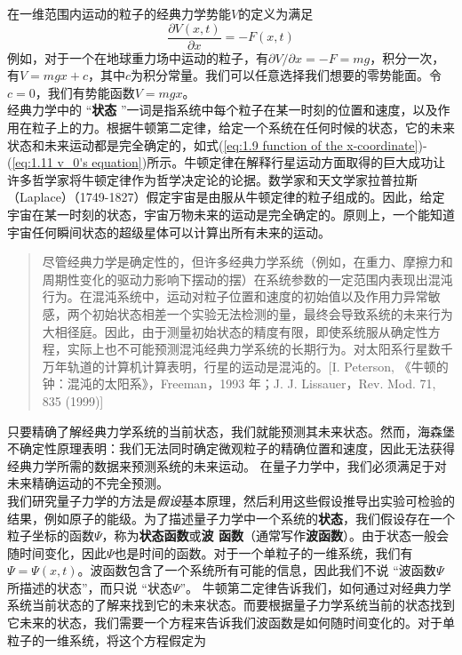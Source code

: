 	 \indent 在一维范围内运动的粒子的经典力学势能$V$的定义为满足
	 \begin{equation}
	 	\boxed{\frac{\partial V \left(x,t\right)}{\partial x} = -F\left(x,t\right)}
	 	\label{eq:1.12 Potential energy in classical mechanics}
	 \end{equation}
	 例如，对于一个在地球重力场中运动的粒子，有$\partial V / \partial x = -F = mg$，积分一次，有$V = mgx+c$，其中$c$为积分常量。我们可以任意选择我们想要的零势能面。令$c=0$，我们有势能函数$V=mgx$。\\
	 \indent 经典力学中的 “\textbf{状态} ”一词是指系统中每个粒子在某一时刻的位置和速度，以及作用在粒子上的力。根据牛顿第二定律，给定一个系统在任何时候的状态，它的未来状态和未来运动都是完全确定的，如式(\ref{eq:1.9 function of the x-coordinate})-(\ref{eq:1.11 v_0's equation})所示。牛顿定律在解释行星运动方面取得的巨大成功让许多哲学家将牛顿定律作为哲学决定论的论据。数学家和天文学家拉普拉斯（Laplace）（1749-1827）假定宇宙是由服从牛顿定律的粒子组成的。因此，给定宇宙在某一时刻的状态，宇宙万物未来的运动是完全确定的。原则上，一个能知道宇宙任何瞬间状态的超级星体可以计算出所有未来的运动。
	\begin{quote}
		\small %
		\noindent %
		尽管经典力学是确定性的，但许多经典力学系统（例如，在重力、摩擦力和周期性变化的驱动力影响下摆动的摆）在系统参数的一定范围内表现出混沌行为。在混沌系统中，运动对粒子位置和速度的初始值以及作用力异常敏感，两个初始状态相差一个实验无法检测的量，最终会导致系统的未来行为大相径庭。因此，由于测量初始状态的精度有限，即使系统服从确定性方程，实际上也不可能预测混沌经典力学系统的长期行为。对太阳系行星数千万年轨道的计算机计算表明，行星的运动是混沌的。[I. Peterson, 《牛顿的钟：混沌的太阳系》，Freeman，1993 年；J. J. Lissauer，Rev. Mod. 71, 835 (1999)]
	\end{quote}
	\indent 
	\indent 只要精确了解经典力学系统的当前状态，我们就能预测其未来状态。然而，海森堡不确定性原理表明：我们无法同时确定微观粒子的精确位置和速度，因此无法获得经典力学所需的数据来预测系统的未来运动。 在量子力学中，我们必须满足于对未来精确运动的不完全预测。\\
	\indent 我们研究量子力学的方法是\textit{假设}基本原理，然后利用这些假设推导出实验可检验的结果，例如原子的能级。为了描述量子力学中一个系统的\textbf{状态}，我们假设存在一个粒子坐标的函数$\Psi$，称为\textbf{状态函数}或\textbf{波 函数}（通常写作\textbf{波函数}）。由于状态一般会随时间变化，因此$\Psi$也是时间的函数。对于一个单粒子的一维系统，我们有$\Psi=\Psi\left(x,t\right)$。波函数包含了一个系统所有可能的信息，因此我们不说 “波函数$\Psi$所描述的状态”，而只说 “状态$\Psi$”。 牛顿第二定律告诉我们，如何通过对经典力学系统当前状态的了解来找到它的未来状态。而要根据量子力学系统当前的状态找到它未来的状态，我们需要一个方程来告诉我们波函数是如何随时间变化的。对于单粒子的一维系统，将这个方程假定为
